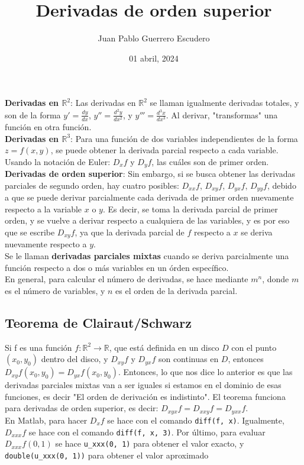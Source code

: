 \documentclass[12pt, letterpaper]{report}
\title{Derivadas de orden superior}
\author{Juan Pablo Guerrero Escudero}
\date{01 abril, 2024}
\begin{document}
\maketitle
\textbf{Derivadas en $\mathbb{R}^2$}: Las derivadas en $\mathbb{R}^2$ se llaman igualmente derivadas totales, 
y son de la forma $y' = \frac{dy}{dx}$, $y'' = \frac{d^2y}{dx^2}$, y $y''' = \frac{d^3x}{dx^3}$. Al derivar, "transformas" 
una función en otra función. \\ 

\textbf{Derivadas en $\mathbb{R}^3$}: Para una función de dos variables independientes de la forma $z = f(x, y)$, se puede obtener 
la derivada parcial respecto a cada variable. Usando la notación de Euler: $D_xf$ y $D_yf$, las cuáles son de primer orden. \\

\textbf{Derivadas de orden superior}: Sin embargo, si se busca obtener las derivadas parciales de segundo orden, hay cuatro posibles: $D_{xx}f$, 
$D_{xy}f$, $D_{yx}f$, $D_{yy}f$, debido a que se puede derivar parcialmente cada derivada de primer orden nuevamente respecto a la variable $x$ o 
$y$. Es decir, se toma la derivada parcial de primer orden, y se vuelve a derivar respecto a cualquiera de las variables, y es por eso que se escribe $D_{xy}f$, 
ya que la derivada parcial de $f$ respecto a $x$ se deriva nuevamente respecto a $y$. \\
Se le llaman \textbf{derivadas parciales mixtas} cuando se deriva parcialmente una función respecto a dos o más variables en un órden específico.\\

En general, para calcular el número de derivadas, se hace mediante $m^n$, donde $m$ es el número de variables, y $n$ es el orden de la derivada parcial. 

\subsection*{Teorema de Clairaut/Schwarz}
Si f es una función $f: \mathbb{R}^2 \rightarrow \mathbb{R}$, que está definida en un disco $D$ con el punto $(x_0, y_0)$ dentro del disco, y $D_{xy}f$ y $D_{yx}f$ son 
continuas en $D$, entonces $D_{xy}f(x_0, y_0) = D_{yx}f(x_0, y_0)$. Entonces, lo que nos dice lo anterior es que las derivadas parciales mixtas 
van a ser iguales si estamos en el dominio de esas funciones, es decir "El orden de derivación es indistinto". El teorema funciona para derivadas de orden superior, es decir: 
$D_{xyx}f = D_{xxy}f = D_{yxx}f$. \\ 

En Matlab, para hacer $D_xf$ se hace con el comando \texttt{diff(f, x)}. Igualmente, $D_{xxx}f$ se hace con el comando 
\texttt{diff(f, x, 3)}. Por último, para evaluar $D_{xxx}f(0, 1)$ se hace \texttt{u\_xxx(0, 1)} para obtener el valor exacto, y 
\texttt{double(u\_xxx(0, 1))} para obtener el valor aproximado
\end{document}
